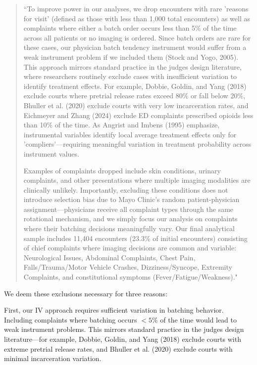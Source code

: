 \documentclass[11pt]{article}
\newcommand{\1}{\hbox{\rm 1\kern-.35em 1}}
\begin{document}
{{\begin{quote}
``To improve power in our analyses, we drop encounters with rare 'reasons for visit' (defined as those with less than 1,000 total encounters) as well as complaints where either a batch order occurs less than 5\% of the time across all patients or no imaging is ordered. Since batch orders are rare for these cases, our physician batch tendency instrument would suffer from a weak instrument problem if we included them (Stock and Yogo, 2005). This approach mirrors standard practice in the judges design literature, where researchers routinely exclude cases with insufficient variation to identify treatment effects. For example, Dobbie, Goldin, and Yang (2018) exclude courts where pretrial release rates exceed 80\% or fall below 20\%, Bhuller et al. (2020) exclude courts with very low incarceration rates, and Eichmeyer and Zhang (2024) exclude ED complaints prescribed opioids less than 10\% of the time. As Angrist and Imbens (1995) emphasize, instrumental variables identify local average treatment effects only for 'compliers'—requiring meaningful variation in treatment probability across instrument values.

Examples of complaints dropped include skin conditions, urinary complaints, and other presentations where multiple imaging modalities are clinically unlikely. Importantly, excluding these conditions does not introduce selection bias due to Mayo Clinic's random patient-physician assignment—physicians receive all complaint types through the same rotational mechanism, and we simply focus our analysis on complaints where their batching decisions meaningfully vary. Our final analytical sample includes 11,404 encounters (23.3\% of initial encounters) consisting of chief complaints where imaging decisions are common and variable: Neurological Issues, Abdominal Complaints, Chest Pain, Falls/Trauma/Motor Vehicle Crashes, Dizziness/Syncope, Extremity Complaints, and constitutional symptoms (Fever/Fatigue/Weakness)."
\end{quote}

We deem these exclusions necessary for three reasons:

First, our IV approach requires sufficient variation in batching behavior. Including complaints where batching occurs $<5\%$ of the time would lead to weak instrument problems. This mirrors standard practice in the judges design literature---for example, Dobbie, Goldin, and Yang (2018) exclude courts with extreme pretrial release rates, and Bhuller et al. (2020) exclude courts with minimal incarceration variation.

}}
\end{document}
